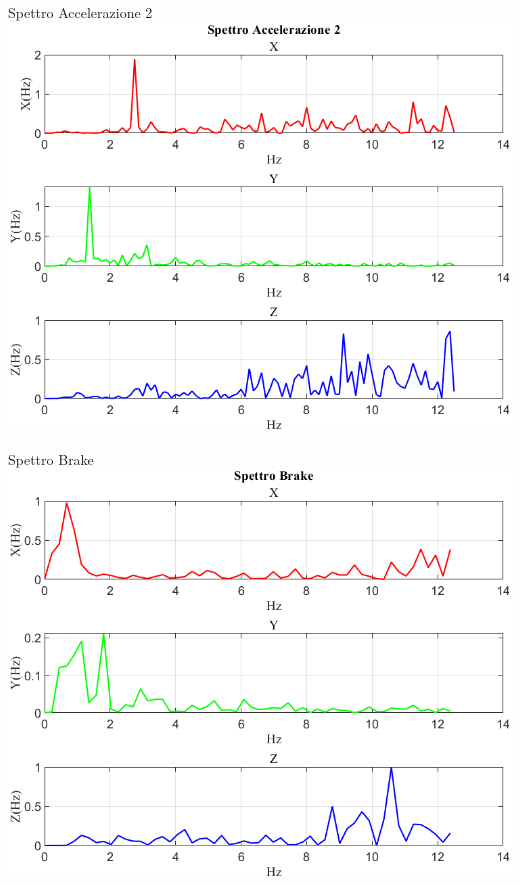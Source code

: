 \documentclass[beamer]{standalone}
\begin{document}
	\begin{frame}{{Spettro Accelerazione 2}}
		\centering\includegraphics[height=.8\textheight]{figure/Acc/Trasformata/Spettro Accelerazione 2}
	\end{frame}
	
	\begin{frame}{{Spettro Brake}}
		\centering\includegraphics[height=.8\textheight]{figure/Acc/Trasformata/Spettro Brake}
	\end{frame}
	
\end{document}

